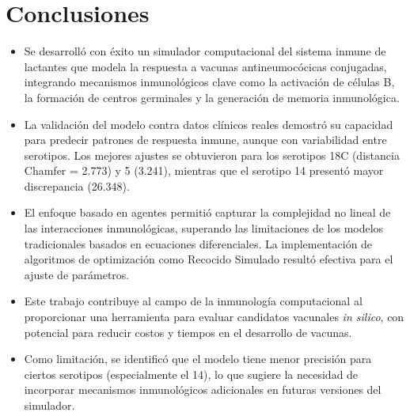 \chapter*{Conclusiones}\label{chapter:conclusions}

\begin{itemize}
    \item Se desarrolló con éxito un simulador computacional del sistema inmune de lactantes que modela la respuesta a vacunas antineumocócicas conjugadas, integrando mecanismos inmunológicos clave como la activación de células B, la formación de centros germinales y la generación de memoria inmunológica.

    \item La validación del modelo contra datos clínicos reales demostró su capacidad para predecir patrones de respuesta inmune, aunque con variabilidad entre serotipos. Los mejores ajustes se obtuvieron para los serotipos 18C (distancia Chamfer = 2.773) y 5 (3.241), mientras que el serotipo 14 presentó mayor discrepancia (26.348).

    \item El enfoque basado en agentes permitió capturar la complejidad no lineal de las interacciones inmunológicas, superando las limitaciones de los modelos tradicionales basados en ecuaciones diferenciales. La implementación de algoritmos de optimización como Recocido Simulado resultó efectiva para el ajuste de parámetros.

    \item Este trabajo contribuye al campo de la inmunología computacional al proporcionar una herramienta para evaluar candidatos vacunales \textit{in silico}, con potencial para reducir costos y tiempos en el desarrollo de vacunas. 

    \item Como limitación, se identificó que el modelo tiene menor precisión para ciertos serotipos (especialmente el 14), lo que sugiere la necesidad de incorporar mecanismos inmunológicos adicionales en futuras versiones del simulador.
\end{itemize}


